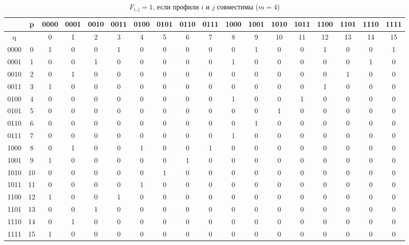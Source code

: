 \begin{enumerate}
\begin{table}[ht]
  \tiny
\caption{$F_{i,j}=1$, если профили $i$ и $j$ совместимы  ($m=4$)}
\centering
\label{tab02}
\begin{tabular}{*{18}{|c}|}
\hline
  & p & {0000} & {0001} & {0010} & {0011} & {0100} & {0101} & {0110} & {0111} & {1000} & {1001} & {1010} & {1011} & {1100} & {1101} & {1110} & {1111} \\
\hline
q &  & 0 & 1 & 2 & 3 & 4 & 5 & 6 & 7 & 8 & 9 & 10 & 11 & 12 & 13 & 14 & 15 \\
\hline
{0000} & 0 & 1 & 0 & 0 & 1 & 0 & 0 & 0 & 0 & 0 & 1 & 0 & 0 & 1 & 0 & 0 & 1 \\
\hline
{0001} & 1 & 0 & 0 & 1 & 0 & 0 & 0 & 0 & 0 & 1 & 0 & 0 & 0 & 0 & 0 & 1 & 0 \\
\hline
{0010} & 2 & 0 & 1 & 0 & 0 & 0 & 0 & 0 & 0 & 0 & 0 & 0 & 0 & 0 & 1 & 0 & 0 \\
\hline
{0011} & 3 & 1 & 0 & 0 & 0 & 0 & 0 & 0 & 0 & 0 & 0 & 0 & 0 & 1 & 0 & 0 & 0 \\
\hline
{0100} & 4 & 0 & 0 & 0 & 0 & 0 & 0 & 0 & 0 & 1 & 0 & 0 & 1 & 0 & 0 & 0 & 0 \\
\hline
{0101} & 5 & 0 & 0 & 0 & 0 & 0 & 0 & 0 & 0 & 0 & 0 & 1 & 0 & 0 & 0 & 0 & 0 \\
\hline
{0110} & 6 & 0 & 0 & 0 & 0 & 0 & 0 & 0 & 0 & 0 & 1 & 0 & 0 & 0 & 0 & 0 & 0 \\
\hline
{0111} & 7 & 0 & 0 & 0 & 0 & 0 & 0 & 0 & 0 & 1 & 0 & 0 & 0 & 0 & 0 & 0 & 0 \\
\hline
{1000} & 8 & 0 & 1 & 0 & 0 & 1 & 0 & 0 & 1 & 0 & 0 & 0 & 0 & 0 & 0 & 0 & 0 \\
\hline
{1001} & 9 & 1 & 0 & 0 & 0 & 0 & 0 & 1 & 0 & 0 & 0 & 0 & 0 & 0 & 0 & 0 & 0 \\
\hline
{1010} & 10 & 0 & 0 & 0 & 0 & 0 & 1 & 0 & 0 & 0 & 0 & 0 & 0 & 0 & 0 & 0 & 0 \\
\hline
{1011} & 11 & 0 & 0 & 0 & 0 & 1 & 0 & 0 & 0 & 0 & 0 & 0 & 0 & 0 & 0 & 0 & 0 \\
\hline
{1100} & 12 & 1 & 0 & 0 & 1 & 0 & 0 & 0 & 0 & 0 & 0 & 0 & 0 & 0 & 0 & 0 & 0 \\
\hline
{1101} & 13 & 0 & 0 & 1 & 0 & 0 & 0 & 0 & 0 & 0 & 0 & 0 & 0 & 0 & 0 & 0 & 0 \\
\hline
{1110} & 14 & 0 & 1 & 0 & 0 & 0 & 0 & 0 & 0 & 0 & 0 & 0 & 0 & 0 & 0 & 0 & 0 \\
\hline
{1111} & 15 & 1 & 0 & 0 & 0 & 0 & 0 & 0 & 0 & 0 & 0 & 0 & 0 & 0 & 0 & 0 & 0 \\
\hline 
\end{tabular}
\end{table}


\end{enumerate}
